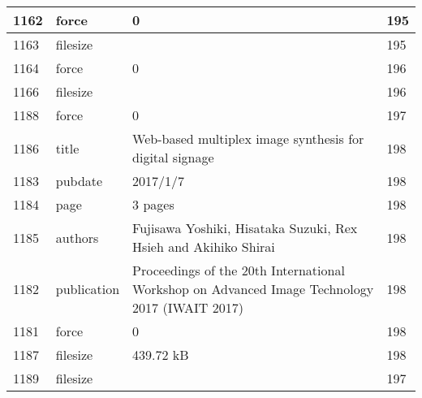 \begin{longtable}{|l|l|l|l|}
1162 & force & 0 & 195 \\ \hline 
1163 & filesize &  & 195 \\ \hline 
1164 & force & 0 & 196 \\ \hline 
1166 & filesize &  & 196 \\ \hline 
1188 & force & 0 & 197 \\ \hline 
1186 & title & Web-based multiplex image synthesis for digital signage & 198 \\ \hline 
1183 & pubdate & 2017/1/7 & 198 \\ \hline 
1184 & page & 3 pages & 198 \\ \hline 
1185 & authors & Fujisawa Yoshiki, Hisataka Suzuki, Rex Hsieh and Akihiko Shirai & 198 \\ \hline 
1182 & publication & Proceedings of the 20th International Workshop on Advanced Image Technology 2017 (IWAIT 2017) & 198 \\ \hline 
1181 & force & 0 & 198 \\ \hline 
1187 & filesize & 439.72 kB & 198 \\ \hline 
1189 & filesize &  & 197 \\ \hline 
 \end{longtable}
